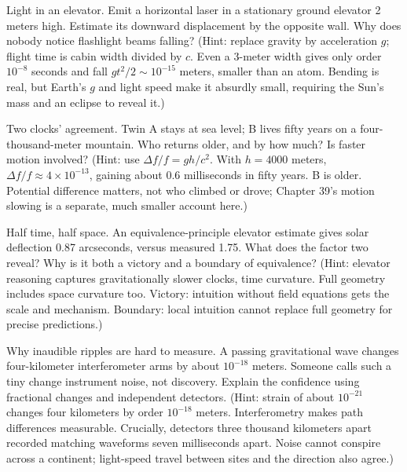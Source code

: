\begin{puzzles}
\item Light in an elevator. Emit a horizontal laser in a stationary ground elevator 2 meters high. Estimate its downward displacement by the opposite wall. Why does nobody notice flashlight beams falling? (Hint: replace gravity by acceleration \(g\); flight time is cabin width divided by \(c\). Even a 3-meter width gives only order \(10^{-8}\) seconds and fall \(gt^{2}/2\sim10^{-15}\) meters, smaller than an atom. Bending is real, but Earth's \(g\) and light speed make it absurdly small, requiring the Sun's mass and an eclipse to reveal it.)
\item Two clocks' agreement. Twin A stays at sea level; B lives fifty years on a four-thousand-meter mountain. Who returns older, and by how much? Is faster motion involved? (Hint: use \(\Delta f/f=gh/c^{2}\). With \(h=4000\) meters, \(\Delta f/f\approx4\times10^{-13}\), gaining about 0.6 milliseconds in fifty years. B is older. Potential difference matters, not who climbed or drove; Chapter 39's motion slowing is a separate, much smaller account here.)
\item Half time, half space. An equivalence-principle elevator estimate gives solar deflection 0.87 arcseconds, versus measured 1.75. What does the factor two reveal? Why is it both a victory and a boundary of equivalence? (Hint: elevator reasoning captures gravitationally slower clocks, time curvature. Full geometry includes space curvature too. Victory: intuition without field equations gets the scale and mechanism. Boundary: local intuition cannot replace full geometry for precise predictions.)
\item Why inaudible ripples are hard to measure. A passing gravitational wave changes four-kilometer interferometer arms by about \(10^{-18}\) meters. Someone calls such a tiny change instrument noise, not discovery. Explain the confidence using fractional changes and independent detectors. (Hint: strain of about \(10^{-21}\) changes four kilometers by order \(10^{-18}\) meters. Interferometry makes path differences measurable. Crucially, detectors three thousand kilometers apart recorded matching waveforms seven milliseconds apart. Noise cannot conspire across a continent; light-speed travel between sites and the direction also agree.)
\end{puzzles}
